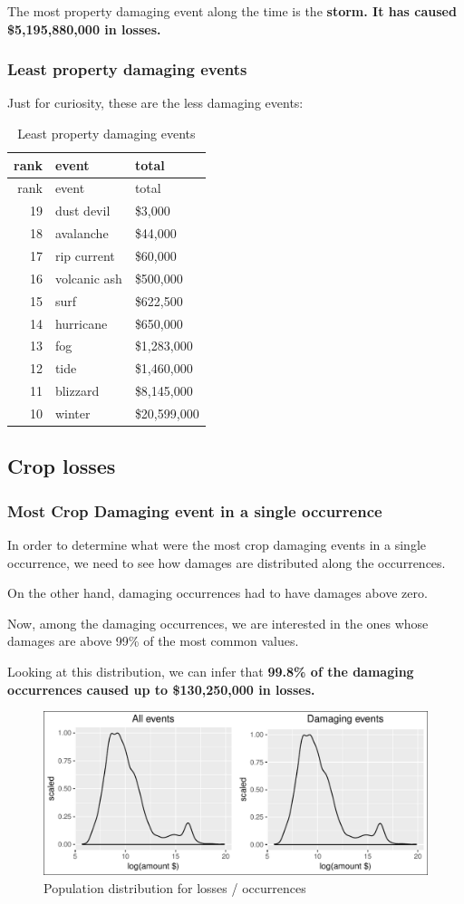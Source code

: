 \documentclass[]{article}
\begin{document}
The most property damaging event along the time is the \textbf{storm. It
has caused \$5,195,880,000 in losses.}

\subsubsection{Least property damaging
events}\label{least-property-damaging-events}

Just for curiosity, these are the less damaging events:

\begin{longtable}[]{@{}rll@{}}
\caption{Least property damaging events}\tabularnewline
\toprule
rank & event & total\tabularnewline
\midrule
\endfirsthead
\toprule
rank & event & total\tabularnewline
\midrule
\endhead
19 & dust devil & \$3,000\tabularnewline
18 & avalanche & \$44,000\tabularnewline
17 & rip current & \$60,000\tabularnewline
16 & volcanic ash & \$500,000\tabularnewline
15 & surf & \$622,500\tabularnewline
14 & hurricane & \$650,000\tabularnewline
13 & fog & \$1,283,000\tabularnewline
12 & tide & \$1,460,000\tabularnewline
11 & blizzard & \$8,145,000\tabularnewline
10 & winter & \$20,599,000\tabularnewline
\bottomrule
\end{longtable}

\subsection{Crop losses}\label{crop-losses}

\subsubsection{Most Crop Damaging event in a single
occurrence}\label{most-crop-damaging-event-in-a-single-occurrence}

In order to determine what were the most crop damaging events in a
single occurrence, we need to see how damages are distributed along the
occurrences.

On the other hand, damaging occurrences had to have damages above zero.

Now, among the damaging occurrences, we are interested in the ones whose
damages are above 99\% of the most common values.

Looking at this distribution, we can infer that \textbf{99.8\% of the
damaging occurrences caused up to \$130,250,000 in losses.}

\begin{figure}[htbp]
\centering
\includegraphics{readme_files/figure-latex/crop-distr-4-1.pdf}
\caption{Population distribution for losses / occurrences}
\end{figure}
\end{document}
